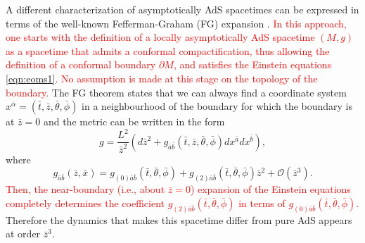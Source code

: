 \documentclass[a4paper,11pt]{article}
\numberwithin{equation}{section}
\begin{document}

A different characterization of asymptotically AdS spacetimes can be expressed in terms of the well-known Fefferman-Graham (FG) expansion \cite{AST_1985__S131__95_0}.
\textcolor{red}{In this approach, one starts with the definition of a locally asymptotically AdS spacetime $(M,g)$ as a spacetime that admits a conformal compactification, thus allowing the definition of a conformal boundary $\partial M$, and satisfies the Einstein equations \eqref{eqn:eoms1}. No assumption is made at this stage on the topology of the boundary.} 
The FG theorem states that
we can always find a coordinate system $x^{\bar{\alpha}}=(\bar{t},\bar{z},\bar{\theta},\bar{\phi})$ in a neighbourhood of the boundary for which the boundary is at $\bar{z}=0$ and the metric can be written in the form
\begin{equation}
\label{eqn:FGmetric}
g=\frac{L^2}{\bar{z}^2}(d\bar{z}^2+g_{\bar{a}\bar{b}}(\bar{t},\bar{z},\bar{\theta},\bar{\phi})dx^{\bar{a}}dx^{\bar{b}}),
\end{equation}
where 
\begin{equation}
\label{eqn:FGbdymetric}
g_{\bar{a}\bar{b}}(\bar{z},\bar{x})=g_{(0)\bar{a}\bar{b}}(\bar{t},\bar{\theta},\bar{\phi})+g_{(2)\bar{a}\bar{b}}(\bar{t},\bar{\theta},\bar{\phi})\bar{z}^2+\mathcal{O}(\bar{z}^3).
\end{equation}
\textcolor{red}{Then, the near-boundary (i.e., about $\bar{z}=0$) expansion of the Einstein equations completely determines the coefficient $g_{(2)\bar{a}\bar{b}}(\bar{t},\bar{\theta},\bar{\phi})$ in terms of $g_{(0)\bar{a}\bar{b}}(\bar{t},\bar{\theta},\bar{\phi})$.}
Therefore the dynamics that makes this spacetime differ from pure AdS appears at order $\bar{z}^3$. 
\end{document}
